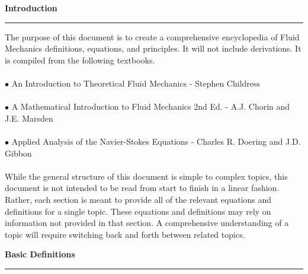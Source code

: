 \documentclass[12pt]{article}
\begin{document}
\begin{huge}
\begin{center}
\textbf{Introduction}
\noindent\rule{16.5cm}{0.4pt}
\end{center}
\end{huge}

\begin{flushleft}
\qquad The purpose of this document is to create a comprehensive encyclopedia of Fluid Mechanics definitions, equations, and principles. It will not include derivations. It is compiled from the following textbooks.
\\~\\
$\bullet$ An Introduction to Theoretical Fluid Mechanics - Stephen Childress
\\~\\
$\bullet$ A Mathematical Introduction to Fluid Mechanics 2nd Ed. - A.J. Chorin and J.E. Marsden
\\~\\
$\bullet$ Applied Analysis of the Navier-Stokes Equations - Charles R. Doering and J.D. Gibbon
\\~\\
\qquad While the general structure of this document is simple to complex topics, this document is not intended to be read from start to finish in a linear fashion. Rather, each section is meant to provide all of the relevant equations and definitions for a single topic. These equations and definitions may rely on information not provided in that section. A comprehensive understanding of a topic will require switching back and forth between related topics.
\end{flushleft}

\pagebreak

\begin{huge}
\begin{center}
\textbf{Basic Definitions}
\noindent\rule{16.5cm}{0.4pt}
\end{center}
\end{huge}
\end{document}

